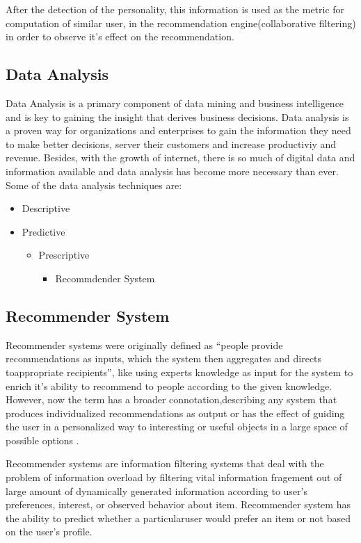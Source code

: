 After the detection of the personality, this information is used as the metric for computation of similar user, in the recommendation engine(collaborative filtering) in order to observe it's effect on the recommendation.

\subsection{Data Analysis}
Data Analysis \cite{analysis} is a primary component of data mining and business intelligence and is key to gaining the insight that derives business decisions. Data analysis is a proven way for organizations and enterprises to gain the information they need to make better decisions, server their customers and increase productiviy and revenue. Besides, with the growth of internet, there is so much of digital data and information available and data analysis has become more necessary than ever. 
Some of the data analysis techniques are:
\begin{itemize}
	\item Descriptive
	\item Predictive
	\begin{itemize}
		\item Prescriptive
		\begin{itemize}
			\item Recommdender System
		\end{itemize}
	\end{itemize}
\end{itemize}
\subsection{Recommender System}
Recommender systems were originally defined as ``people provide recommendations as inputs, which the system then aggregates and directs toappropriate recipients'', like using experts knowledge as input for the system to enrich it's ability to recommend to people according to the given knowledge. However, now the term has a broader connotation,describing any system that produces individualized recommendations as output or has the effect of guiding the user in a personalized way to interesting or useful objects in a large space of possible options \cite{rdef}.

Recommender systems are information filtering systems that deal with the problem of information overload by filtering vital information fragement out of large amount of dynamically generated information according to user's preferences, interest, or observed behavior about item. Recommender system has the ability to predict whether a particularuser would prefer an item or not based on the user's profile.

